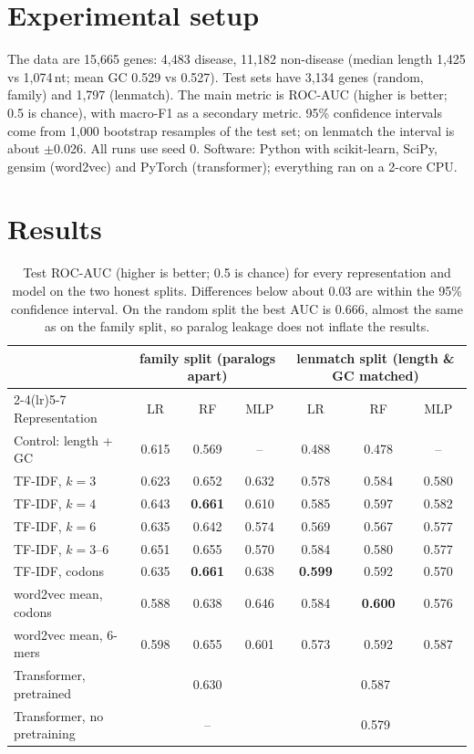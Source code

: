 \documentclass[11pt,a4paper,twocolumn]{article}
\begin{document}
\section{Experimental setup}
The data are 15,665 genes: 4,483 disease, 11,182 non-disease (median length 1,425
vs 1,074\,nt; mean GC 0.529 vs 0.527). Test sets have 3,134 genes (random,
family) and 1,797 (lenmatch). The main metric is ROC-AUC (higher is better; 0.5
is chance), with macro-F1 as a secondary metric. 95\% confidence intervals come
from 1,000 bootstrap resamples of the test set; on lenmatch the interval is about
$\pm$0.026. All runs use seed 0. Software: Python with scikit-learn, SciPy,
gensim (word2vec) and PyTorch (transformer); everything ran on a 2-core CPU.

\section{Results}
\begin{table}[t]
\centering
\small
\begin{tabular}{lcccccc}
\toprule
 & \multicolumn{3}{c}{family split (paralogs apart)} & \multicolumn{3}{c}{lenmatch split (length \& GC matched)} \\
\cmidrule(lr){2-4}\cmidrule(lr){5-7}
Representation & LR & RF & MLP & LR & RF & MLP \\
\midrule
Control: length + GC & 0.615 & 0.569 & -- & 0.488 & 0.478 & -- \\
TF-IDF, $k=3$ & 0.623 & 0.652 & 0.632 & 0.578 & 0.584 & 0.580 \\
TF-IDF, $k=4$ & 0.643 & \textbf{0.661} & 0.610 & 0.585 & 0.597 & 0.582 \\
TF-IDF, $k=6$ & 0.635 & 0.642 & 0.574 & 0.569 & 0.567 & 0.577 \\
TF-IDF, $k=3$--$6$ & 0.651 & 0.655 & 0.570 & 0.584 & 0.580 & 0.577 \\
TF-IDF, codons & 0.635 & \textbf{0.661} & 0.638 & \textbf{0.599} & 0.592 & 0.570 \\
word2vec mean, codons & 0.588 & 0.638 & 0.646 & 0.584 & \textbf{0.600} & 0.576 \\
word2vec mean, 6-mers & 0.598 & 0.655 & 0.601 & 0.573 & 0.592 & 0.587 \\
\midrule
Transformer, pretrained & \multicolumn{3}{c}{0.630} & \multicolumn{3}{c}{0.587} \\
Transformer, no pretraining & \multicolumn{3}{c}{--} & \multicolumn{3}{c}{0.579} \\
\bottomrule
\end{tabular}
\caption{Test ROC-AUC (higher is better; 0.5 is chance) for every representation
and model on the two honest splits. Differences below about 0.03 are within the
95\% confidence interval. On the random split the best AUC is 0.666, almost the
same as on the family split, so paralog leakage does not inflate the results.}
\label{tab:results}
\end{table}
\end{document}
